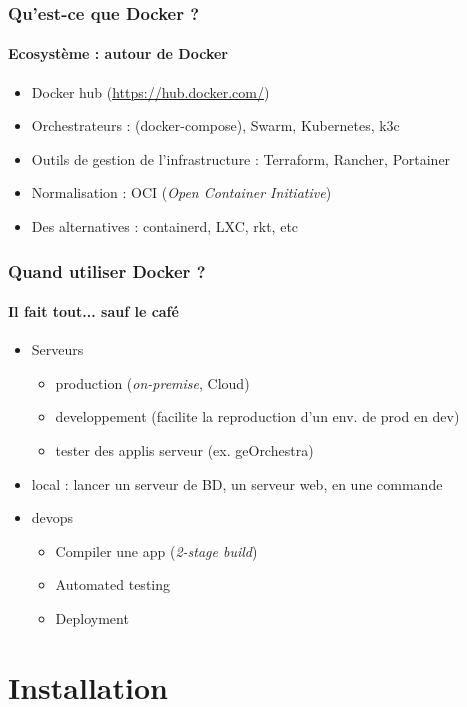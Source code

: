 \documentclass[11pt]{beamer}
\begin{document}
\begin{frame}
\frametitle{Qu'est-ce que Docker ?}
\framesubtitle{Ecosystème : autour de Docker}
\begin{itemize}
	\item Docker hub (\url{https://hub.docker.com/})
	\item Orchestrateurs : (docker-compose), Swarm, Kubernetes, k3c
	\item Outils de gestion de l'infrastructure : Terraform, Rancher, Portainer
	\item Normalisation : OCI (\textit{Open Container Initiative})
	\item Des alternatives : containerd, LXC, rkt, etc
\end{itemize}
\end{frame}

\begin{frame}
\frametitle{Quand utiliser Docker ?}
\framesubtitle{Il fait tout... sauf le café}
\begin{itemize}
	\item Serveurs
	\begin{itemize}
		\item production (\textit{on-premise}, Cloud)
		\item developpement (facilite la reproduction d'un env. de prod en dev)
		\item tester des applis serveur (ex. geOrchestra)
	\end{itemize}
	\item local : lancer un serveur de BD, un serveur web, en une commande
	\item devops
	\begin{itemize}
		\item Compiler une app (\textit{2-stage build})
		\item Automated testing
		\item Deployment
	\end{itemize}
\end{itemize}
\end{frame}

\section{Installation}
\end{document}
